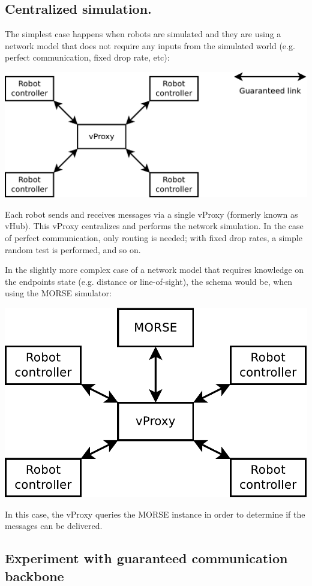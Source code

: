 \documentclass[a4paper,11pt]{article}
\begin{document}
\subsection{Centralized simulation.}

The simplest case happens when robots are simulated and they are using a network model that does not require any inputs from the simulated world (e.g. perfect communication, fixed drop rate, etc):

\begin{center}
\includegraphics[width=0.666\columnwidth]{figures/central}
\end{center}

Each robot sends and receives messages via a single vProxy (formerly known as vHub). This vProxy centralizes and performs the network simulation. In the case of perfect communication, only routing is needed; with fixed drop rates, a simple random test is performed, and so on.

In the slightly more complex case of a network model that requires knowledge on the endpoints state (e.g. distance or line-of-sight), the schema would be, when using the MORSE simulator:

\begin{center}
\includegraphics[width=0.666\columnwidth]{figures/central+morse}
\end{center}

In this case, the vProxy queries the MORSE instance in order to determine if the messages can be delivered.

\subsection{Experiment with guaranteed communication backbone}
\end{document}
